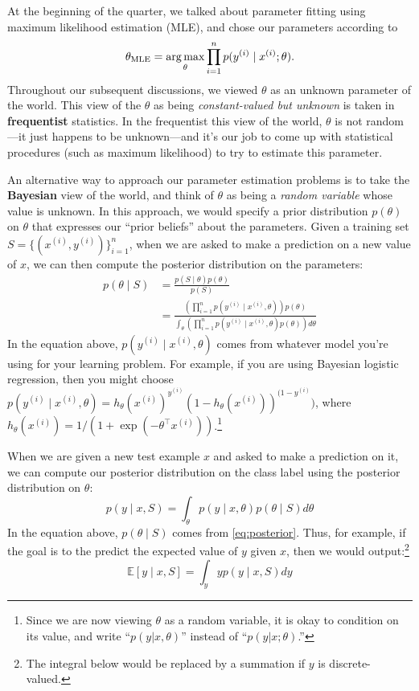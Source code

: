 At the beginning of the quarter, we talked about parameter fitting using
maximum likelihood estimation (MLE), and chose our parameters according
to
\begin{equation}
    \theta_\text{MLE} = \argmax_\theta \prod_{i=1}^n p(y^{(i)} \mid x^{(i)}; \theta).
\end{equation}
Throughout our subsequent discussions, we viewed $\theta$ as an unknown
parameter of the world. This view of the $\theta$ as being \textit{constant-valued but unknown} is
taken in \textbf{frequentist} statistics. In the frequentist this view of the world, $\theta$
is not random---it just happens to be unknown---and it's our job to come up
with statistical procedures (such as maximum likelihood) to try to estimate
this parameter.

An alternative way to approach our parameter estimation problems is
to take the \textbf{Bayesian} view of the world, and think of $\theta$ as being a
\textit{random variable} whose value is unknown. In this approach, we would specify
a prior distribution $p(\theta)$ on $\theta$ that expresses our ``prior beliefs'' about the
parameters. Given a training set $S = \{(x^{(i)}, y^{(i)})\}^n_{i=1}$, when we are asked to
make a prediction on a new value of $x$, we can then compute the posterior
distribution on the parameters:
\begin{align}\label{eq:posterior}
    p(\theta \mid S) &= \frac{p(S \mid \theta)p(\theta)}{p(S)}\\
        &= \frac{\left(\prod_{i=1}^n p(y^{(i)} \mid x^{(i)}, \theta) \right) p(\theta)}{\int_\theta \left(\prod_{i=1}^n p(y^{(i)} \mid x^{(i)}, \theta) p(\theta) \right) d\theta}
\end{align}
In the equation above, $p(y^{(i)} \mid x^{(i)}, \theta)$ comes from whatever model you're using
for your learning problem. For example, if you are using Bayesian logistic
regression, then you might choose $p(y^{(i)} \mid x^{(i)},\theta) = h_\theta (x^{(i)})^{y^{(i)}} (1-h_\theta (x^{(i)}))^{(1-y^{(i)}}) $, where $h_\theta(x^{(i)}) = 1/(1 + \exp(-\theta^\top x^{(i)}))$.\footnote{
Since we are now viewing $\theta$ as a random variable, it is okay to condition on its value, %
and write ``$p(y|x,\theta)$'' instead of ``$p(y|x;\theta)$.''}

When we are given a new test example $x$ and asked to make a prediction %
on it, we can compute our posterior distribution on the class label using the
posterior distribution on $\theta$:
\begin{equation}\label{eq:conditional}
    p(y \mid x,S) = \int_\theta p(y \mid x,\theta)p(\theta \mid S)d\theta
\end{equation}
In the equation above, $p(\theta \mid S)$ comes from \cref{eq:posterior}. Thus, for example,
if the goal is to the predict the expected value of $y$ given $x$, then we would
output:\footnote{The integral below would be replaced by a summation if $y$ is discrete-valued.}
\begin{equation}
    \mathbb E[y \mid x,S] = \int_y y p(y \mid x,S)dy
\end{equation}

